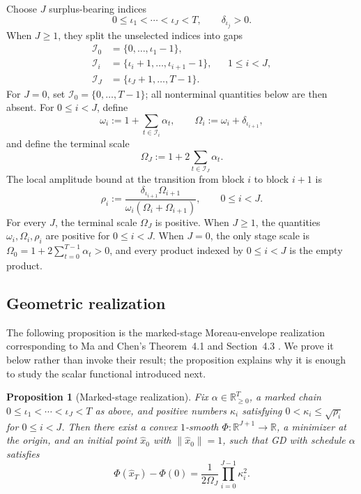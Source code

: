 \documentclass[11pt]{article}
\newtheorem{proposition}[theorem]{Proposition}
\theoremstyle{definition}
\theoremstyle{remark}
\newcommand{\R}{\mathbb{R}}
\begin{document}
Choose \(J\) surplus-bearing indices
\[
 0\le \iota_1<\cdots<\iota_J<T,\qquad \delta_{\iota_j}>0.
\]
When \(J\ge1\), they split the unselected indices into gaps
\[
\begin{aligned}
 \mathcal I_0&=\{0,\ldots,\iota_1-1\},\\
 \mathcal I_i&=\{\iota_i+1,\ldots,\iota_{i+1}-1\},
       &&1\le i<J,\\
 \mathcal I_J&=\{\iota_J+1,\ldots,T-1\}.
\end{aligned}
\]
For \(J=0\), set \(\mathcal I_0=\{0,\ldots,T-1\}\); all nonterminal quantities
below are then absent.
For \(0\le i<J\), define
\begin{equation}
 \omega_i:=1+\sum_{t\in\mathcal I_i}\alpha_t,
 \qquad
 \Omega_i:=\omega_i+\delta_{\iota_{i+1}},
 \label{eq:block-masses}
\end{equation}
and define the terminal scale
\begin{equation}
 \Omega_J:=1+2\sum_{t\in\mathcal I_J}\alpha_t.
 \label{eq:terminal-scale}
\end{equation}
The local amplitude bound at the transition from block \(i\) to block
\(i+1\) is
\begin{equation}
 \rho_i
 :=
 \frac{\delta_{\iota_{i+1}}\Omega_{i+1}}
      {\omega_i(\Omega_i+\Omega_{i+1})},
 \qquad 0\le i<J.
 \label{eq:chi-def}
\end{equation}
For every \(J\), the terminal scale \(\Omega_J\) is positive.  When
\(J\ge1\), the quantities \(\omega_i,\Omega_i,\rho_i\) are positive for
\(0\le i<J\).  When \(J=0\), the only stage scale is
\(\Omega_0=1+2\sum_{t=0}^{T-1}\alpha_t>0\), and every product indexed by
\(0\le i<J\) is the empty product.

\subsection{Geometric realization}

The following proposition is the marked-stage Moreau-envelope realization
corresponding to Ma and Chen's Theorem~4.1 and Section~4.3
\cite{machen2026}.  We prove it below rather than invoke their result; the
proposition explains why it is enough to study the scalar functional
introduced next.

\begin{proposition}[Marked-stage realization]
\label{prop:realization}
Fix \(\alpha\in\R_{\ge0}^T\), a marked chain
\(0\le \iota_1<\cdots<\iota_J<T\) as above, and positive numbers
\(\kappa_i\) satisfying \(0<\kappa_i\le\sqrt{\rho_i}\) for
\(0\le i<J\).  Then there exist a convex \(1\)-smooth
\(\Phi:\R^{J+1}\to\R\), a minimizer at the origin, and an initial point
\(\widehat x_0\) with \(\|\widehat x_0\|=1\), such that GD with schedule
\(\alpha\)
satisfies
\begin{equation}
 \Phi(\widehat x_T)-\Phi(0)
 =\frac{1}{2\Omega_J}\prod_{i=0}^{J-1}\kappa_i^2.
 \label{eq:realized-gap}
\end{equation}
\end{proposition}
\end{document}
